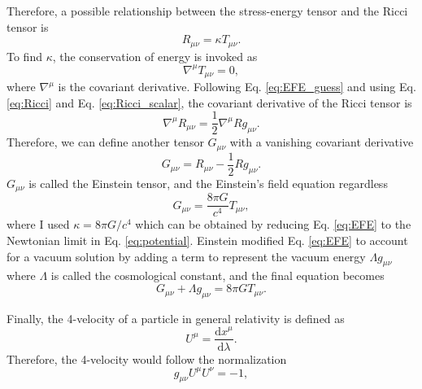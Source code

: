 Therefore, a possible relationship between the stress-energy tensor and the Ricci tensor is
\begin{equation} \label{eq:EFE_guess}
    R_{\mu\nu} = \kappa T_{\mu\nu}.
\end{equation}
To find $\kappa$, the conservation of energy is invoked as  
\begin{equation}
    \nabla^\mu T_{\mu\nu} = 0,
\end{equation}
where $\nabla^\mu$ is the covariant derivative. Following Eq. \ref{eq:EFE_guess} and using Eq. \ref{eq:Ricci} and Eq. \ref{eq:Ricci_scalar}, the covariant derivative of the Ricci tensor is
\begin{equation}
    \nabla^\mu R_{\mu\nu} = \frac{1}{2} \nabla^\mu R g_{\mu\nu}.
\end{equation}    
Therefore, we can define another tensor $G_{\mu \nu}$ with a vanishing covariant derivative
\begin{equation}
    G_{\mu\nu} = R_{\mu\nu} - \frac{1}{2} R g_{\mu\nu}.
\end{equation}
$G_{\mu\nu}$ is called the Einstein tensor, and the Einstein's field equation regardless
\begin{equation} \label{eq:EFE}
    G_{\mu\nu} = \frac{8\pi G}{c^4} T_{\mu\nu},
\end{equation}
where I used $\kappa = 8\pi G/c^4$ which can be obtained by reducing Eq. \ref{eq:EFE} to the Newtonian limit in Eq. \ref{eq:potential}. Einstein modified Eq. \ref{eq:EFE} to account for a vacuum solution by adding a term to represent the vacuum energy $\Lambda g_{\mu \nu}$ where $\Lambda$ is called the cosmological constant, and the final equation becomes
\begin{equation} \label{eq:EFE_full}
    G_{\mu\nu} + \Lambda g_{\mu \nu} = 8\pi G T_{\mu\nu}.
\end{equation}



Finally, the 4-velocity of a particle in general relativity is defined as 
\begin{equation} \label{eq:4-velocity}
    U^{\mu} = \frac{\mathrm{d}x^{\mu}}{\mathrm{d}\lambda}.
\end{equation}
Therefore, the 4-velocity would follow the normalization
\begin{equation}
    g_{\mu \nu}U^{\mu}U^{\nu} = -1,
\end{equation}

